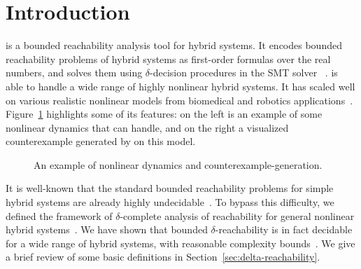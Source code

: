 \section{Introduction}\label{sec:intro}


\dReach{} is a bounded reachability analysis tool for hybrid systems. It encodes
bounded reachability problems of hybrid systems as first-order
formulas over the real numbers, and solves them using
$\delta$-decision procedures in the SMT solver \dReal{}~\cite{}. \dReach{} is
able to handle a wide range of highly nonlinear hybrid systems. It has
scaled well on various realistic nonlinear models from biomedical and
robotics applications~\cite{}. Figure~\ref{fig:prostate-example} highlights 
some of its features: 
on the left is an example of some nonlinear dynamics that \dReach{} can handle, 
and on the right a visualized counterexample generated by \dReach{} on this model.
\begin{figure}[!h]
  \hfill
  \caption{An example of nonlinear dynamics and counterexample-generation.}
  \label{fig:prostate-example}
\end{figure}

It is well-known that the standard bounded reachability problems for
simple hybrid systems are already highly
undecidable~\cite{DBLP:conf/rex/AlurD91,DBLP:conf/hybrid/AlurCHH92}. To bypass this difficulty, we defined the framework
of $\delta$-complete analysis of reachability for general nonlinear hybrid systems~\cite{}. 
We have shown that bounded $\delta$-reachability is in fact decidable for a wide range of hybrid systems, with reasonable
complexity bounds~\cite{}. We give a brief review of some basic definitions in
Section~\ref{sec:delta-reachability}.

